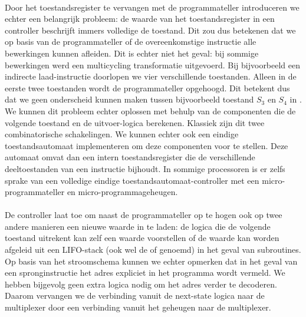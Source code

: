 \paragraph{}
Door het toestandsregister te vervangen met de programmateller introduceren we echter een belangrijk probleem: de waarde van het toestandsregister in een controller beschrijft immers volledige de toestand. Dit zou dus betekenen dat we op basis van de programmateller of de overeenkomstige instructie alle bewerkingen kunnen afleiden. Dit is echter niet het geval: bij sommige bewerkingen werd een multicycling transformatie uitgevoerd. Bij bijvoorbeeld een indirecte laad-instructie doorlopen we vier verschillende toestanden. Alleen in de eerste twee toestanden wordt de programmateller opgehoogd. Dit betekent dus dat we geen onderscheid kunnen maken tussen bijvoorbeeld toestand $S_3$ en $S_4$ in . We kunnen dit probleem echter oplossen met behulp van de componenten die de volgende toestand en de uitvoer-logica berekenen. Klassiek zijn dit twee combinatorische schakelingen. We kunnen echter ook een eindige toestandsautomaat implementeren om deze componenten voor te stellen. Deze automaat omvat dan een intern toestandsregister die de verschillende deeltoestanden van een instructie bijhoudt. In sommige processoren is er zelfs sprake van een volledige eindige toestandsautomaat-controller met een micro-programmateller en micro-programmageheugen.
\paragraph{}
De controller laat toe om naast de programmateller op te hogen ook op twee andere manieren een nieuwe waarde in te laden: de logica die de volgende toestand uitrekent kan zelf een waarde voorstellen of de waarde kan worden afgeleid uit een LIFO-stack (ook wel de  of  genoemd) in het geval van subroutines. Op basis van het stroomschema kunnen we echter opmerken dat in het geval van een spronginstructie het adres expliciet in het programma wordt vermeld. We hebben bijgevolg geen extra logica nodig om het adres verder te decoderen. Daarom vervangen we de verbinding vanuit de next-state logica naar de multiplexer door een verbinding vanuit het geheugen naar de multiplexer.
